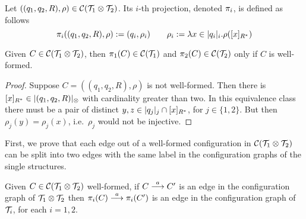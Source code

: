 \begin{definition}
Let $((q_1,q_2,R),\rho) \in \mathcal{C}(\mathcal{T}_1 \otimes \mathcal{T}_2)$. Its $i$-th projection, denoted $\pi_i$, is defined as follows
\[
	\pi_i((q_1,q_2,R),\rho) := (q_i,\rho_i) \qquad \rho_i := \lambda x \in |q_i|_i.\rho([x]_{R^*}) 
\]
\end{definition}
%
\begin{lemma}
Given $C \in \mathcal{C}(\mathcal{T}_1 \otimes \mathcal{T}_2)$, then $\pi_1(C) \in \mathcal{C}(\mathcal{T}_1)$ and $\pi_2(C) \in \mathcal{C}(\mathcal{T}_2)$ only if $C$ is well-formed.
\end{lemma}
\begin{proof}
Suppose $C= ((q_1,q_2,R),\rho)$ is not well-formed. Then there is $[x]_{R^*} \in |(q_1,q_2,R)|_{\otimes}$ with cardinality greater than two. In this equivalence class there must be a pair of distinct $y,z \in |q_j|_j \cap [x]_{R^*}$, for $j \in \{1,2\}$. But then $\rho_j(y) = \rho_j(x)$, i.e.\ $\rho_j$ would not be injective.

\end{proof}
%
First, we prove that each edge out of a well-formed configuration in $\mathcal{C}(\mathcal{T}_1 \otimes \mathcal{T}_2)$ can be split into two edges with the same label in the configuration graphs of the single structures.
%
\begin{proposition}
\label{prop:proj-preserve}
Given $C\in \mathcal{C}(\mathcal{T}_1 \otimes \mathcal{T}_2)$ well-formed, if $C \overset{a}{\longrightarrow} C'$ is an edge in the configuration graph of $\mathcal{T}_1 \otimes \mathcal{T}_2$ then $\pi_i(C) \overset{a}{\longrightarrow} \pi_i(C')$ is an edge in the configuration graph of $\mathcal{T}_i$, for each $i=1,2$.
\end{proposition}
